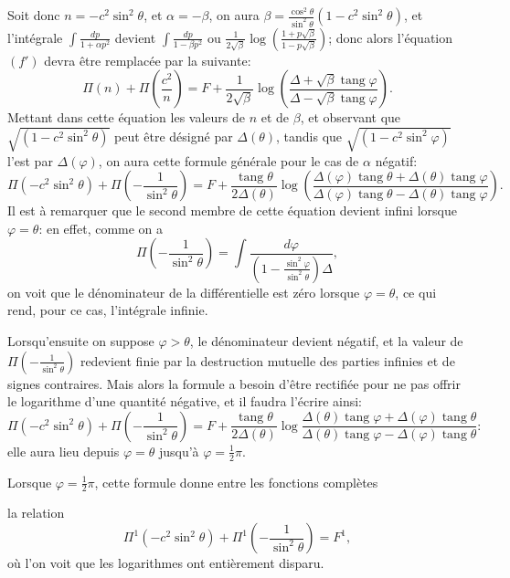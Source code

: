 \documentclass{article}
\begin{document}
Soit donc $n=-c^{2}\sin^{2}\theta$, et $\alpha=-\beta$, on aura $\beta=\frac{\cos^{2}\theta}{\sin^{2}\theta}(1-c^{2}\sin^{2}\theta)$, et l'intégrale $\displaystyle\int\frac{dp}{1+\alpha p^{2}}$ devient $\displaystyle\int\frac{dp}{1-\beta p^{2}}$ ou $\frac{1}{2\sqrt{\beta}}\log\left(\frac{1+p\sqrt{\beta}}{1-p\sqrt{\beta}}\right)$; donc alors l'équation $(f')$ devra être remplacée par la suivante:
\[ \Pi(n)+\Pi\left(\frac{c^{2}}{n}\right)=F+\frac{1}{2\sqrt{\beta}}\log\left(\frac{\Delta+\sqrt{\beta}\operatorname{tang}\varphi}{\Delta-\sqrt{\beta}\operatorname{tang}\varphi}\right). \]
Mettant dans cette équation les valeurs de $n$ et de $\beta$, et observant que $\sqrt{(1-c^{2}\sin^{2}\theta)}$ peut être désigné par $\Delta(\theta)$, tandis que $\sqrt{(1-c^{2}\sin^{2}\varphi)}$ l'est par $\Delta(\varphi)$, on aura cette formule générale pour le cas de $\alpha$ négatif:
\[ \Pi(-c^{2}\sin^{2}\theta)+\Pi\left(-\frac{1}{\sin^{2}\theta}\right)=F+\frac{\operatorname{tang}\theta}{2\Delta(\theta)}\log\left(\frac{\Delta(\varphi)\operatorname{tang}\theta+\Delta(\theta)\operatorname{tang}\varphi}{\Delta(\varphi)\operatorname{tang}\theta-\Delta(\theta)\operatorname{tang}\varphi}\right). \]
Il est à remarquer que le second membre de cette équation devient infini lorsque $\varphi=\theta$: en effet, comme on a
\[ \Pi\left(-\frac{1}{\sin^{2}\theta}\right)=\int\frac{d\varphi}{\left(1-\frac{\sin^{2}\varphi}{\sin^{2}\theta}\right)\Delta}, \]
on voit que le dénominateur de la différentielle est zéro lorsque $\varphi=\theta$, ce qui rend, pour ce cas, l'intégrale infinie.

Lorsqu'ensuite on suppose $\varphi>\theta$, le dénominateur devient négatif, et la valeur de $\Pi\left(-\frac{1}{\sin^{2}\theta}\right)$ redevient finie par la destruction mutuelle des parties infinies et de signes contraires. Mais alors la formule a besoin d'être rectifiée pour ne pas offrir le logarithme d'une quantité négative, et il faudra l'écrire ainsi:
\[ \Pi(-c^{2}\sin^{2}\theta)+\Pi\left(-\frac{1}{\sin^{2}\theta}\right)=F+\frac{\operatorname{tang}\theta}{2\Delta(\theta)}\log\frac{\Delta(\theta)\operatorname{tang}\varphi+\Delta(\varphi)\operatorname{tang}\theta}{\Delta(\theta)\operatorname{tang}\varphi-\Delta(\varphi)\operatorname{tang}\theta}: \]
elle aura lieu depuis $\varphi=\theta$ jusqu'à $\varphi=\frac{1}{2}\pi$.

Lorsque $\varphi=\frac{1}{2}\pi$, cette formule donne entre les fonctions complètes

la relation
\[ \Pi^{1}(-c^{2}\sin^{2}\theta)+\Pi^{1}\left(-\frac{1}{\sin^{2}\theta}\right)=F^{1}, \]
où l'on voit que les logarithmes ont entièrement disparu.
\end{document}
